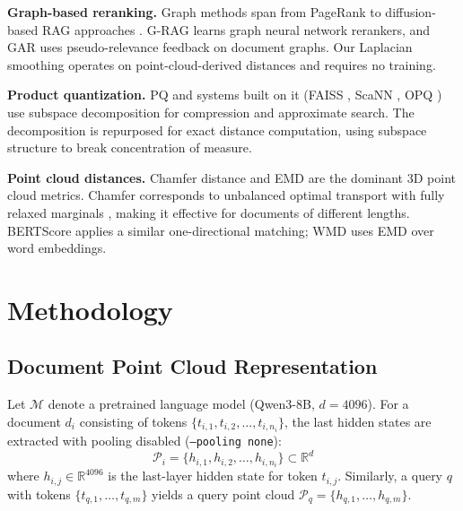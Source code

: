 \documentclass[review,1p]{elsarticle}
\newcommand{\R}{\mathbb{R}}
\begin{document}
\textbf{Graph-based reranking.} Graph methods span from PageRank \citep{page1999pagerank} to diffusion-based RAG approaches \citep{dampanaboina2024diffrag}. G-RAG \citep{glass2024grag} learns graph neural network rerankers, and GAR \citep{macavaney2022gar} uses pseudo-relevance feedback on document graphs. Our Laplacian smoothing operates on point-cloud-derived distances and requires no training.

\textbf{Product quantization.} PQ \citep{jegou2011pq} and systems built on it (FAISS \citep{johnson2021faiss}, ScaNN \citep{guo2020scann}, OPQ \citep{ge2014opq}) use subspace decomposition for compression and approximate search. The decomposition is repurposed for exact distance computation, using subspace structure to break concentration of measure.

\textbf{Point cloud distances.} Chamfer distance \citep{fan2017chamfer} and EMD \citep{rubner2000emd} are the dominant 3D point cloud metrics. Chamfer corresponds to unbalanced optimal transport with fully relaxed marginals \citep{sejourne2023uot}, making it effective for documents of different lengths. BERTScore \citep{zhang2020bertscore} applies a similar one-directional matching; WMD \citep{kusner2015wmd} uses EMD over word embeddings.

\section{Methodology}
\label{sec:method}

\subsection{Document Point Cloud Representation}
\label{subsec:point-cloud}

Let $\mathcal{M}$ denote a pretrained language model (Qwen3-8B, $d = 4096$). For a document $d_i$ consisting of tokens $\{t_{i,1}, t_{i,2}, \ldots, t_{i,n_i}\}$, the last hidden states are extracted with pooling disabled (\texttt{--pooling none}):
\begin{equation}
\label{eq:point-cloud}
\mathcal{P}_i = \{h_{i,1}, h_{i,2}, \ldots, h_{i,n_i}\} \subset \R^d
\end{equation}
where $h_{i,j} \in \R^{4096}$ is the last-layer hidden state for token $t_{i,j}$. Similarly, a query $q$ with tokens $\{t_{q,1}, \ldots, t_{q,m}\}$ yields a query point cloud $\mathcal{P}_q = \{h_{q,1}, \ldots, h_{q,m}\}$.
\end{document}
